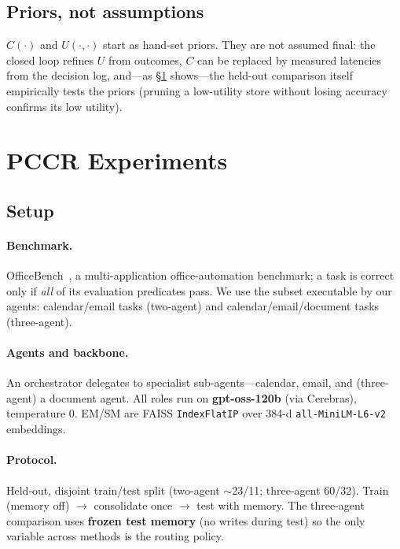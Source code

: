 \documentclass[10pt,twocolumn]{article}
\newcommand{\code}[1]{\texttt{\small #1}}
\begin{document}
\subsection{Priors, not assumptions}
$C(\cdot)$ and $U(\cdot,\cdot)$ start as hand-set priors. They are not assumed
final: the closed loop refines $U$ from outcomes, $C$ can be replaced by measured
latencies from the decision log, and---as \S\ref{sec:pccr-results} shows---the
held-out comparison itself empirically tests the priors (pruning a low-utility
store without losing accuracy confirms its low utility).

\section{PCCR Experiments}\label{sec:pccr-results}
\subsection{Setup}
\paragraph{Benchmark.} OfficeBench~\cite{officebench}, a multi-application
office-automation benchmark; a task is correct only if \emph{all} of its
evaluation predicates pass. We use the subset executable by our agents:
calendar/email tasks (two-agent) and calendar/email/document tasks (three-agent).

\paragraph{Agents and backbone.} An orchestrator delegates to specialist
sub-agents---calendar, email, and (three-agent) a document agent. All roles run on
\textbf{gpt-oss-120b} (via Cerebras), temperature 0. EM/SM are FAISS
\code{IndexFlatIP} over 384-d \code{all-MiniLM-L6-v2} embeddings.

\paragraph{Protocol.} Held-out, disjoint train/test split (two-agent
$\sim$23/11; three-agent 60/32). Train (memory off) $\rightarrow$ consolidate once
$\rightarrow$ test with memory. The three-agent comparison uses \textbf{frozen
test memory} (no writes during test) so the only variable across methods is the
routing policy.
\end{document}
